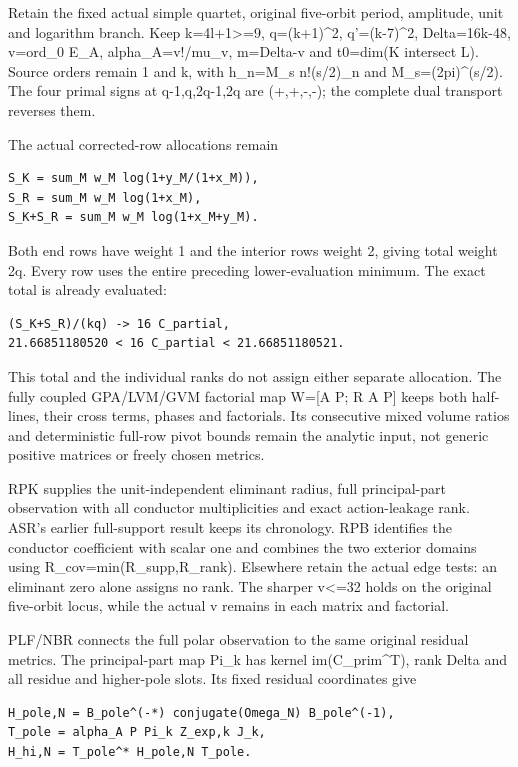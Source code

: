 \documentclass[
]{article}
\begin{document}
Retain the fixed actual simple quartet, original five-orbit period,
amplitude, unit and logarithm branch. Keep k=4l+1\textgreater=9,
q=(k+1)\^{}2, q'=(k-7)\^{}2, Delta=16k-48, v=ord\_0 E\_A,
alpha\_A=v!/mu\_v, m=Delta-v and t0=dim(K intersect L). Source orders
remain 1 and k, with h\_n=M\_s n!(s/2)\_n and M\_s=(2pi)\^{}(s/2). The
four primal signs at q-1,q,2q-1,2q are (+,+,-,-); the complete dual
transport reverses them.

The actual corrected-row allocations remain

\begin{verbatim}
S_K = sum_M w_M log(1+y_M/(1+x_M)),
S_R = sum_M w_M log(1+x_M),
S_K+S_R = sum_M w_M log(1+x_M+y_M).
\end{verbatim}

Both end rows have weight 1 and the interior rows weight 2, giving total
weight 2q. Every row uses the entire preceding lower-evaluation minimum.
The exact total is already evaluated:

\begin{verbatim}
(S_K+S_R)/(kq) -> 16 C_partial,
21.66851180520 < 16 C_partial < 21.66851180521.
\end{verbatim}

This total and the individual ranks do not assign either separate
allocation. The fully coupled GPA/LVM/GVM factorial map W={[}A P; R A
P{]} keeps both half-lines, their cross terms, phases and factorials.
Its consecutive mixed volume ratios and deterministic full-row pivot
bounds remain the analytic input, not generic positive matrices or
freely chosen metrics.

RPK supplies the unit-independent eliminant radius, full principal-part
observation with all conductor multiplicities and exact action-leakage
rank. ASR's earlier full-support result keeps its chronology. RPB
identifies the conductor coefficient with scalar one and combines the
two exterior domains using R\_cov=min(R\_supp,R\_rank). Elsewhere retain
the actual edge tests: an eliminant zero alone assigns no rank. The
sharper v\textless=32 holds on the original five-orbit locus, while the
actual v remains in each matrix and factorial.

PLF/NBR connects the full polar observation to the same original
residual metrics. The principal-part map Pi\_k has kernel
im(C\_prim\^{}T), rank Delta and all residue and higher-pole slots. Its
fixed residual coordinates give

\begin{verbatim}
H_pole,N = B_pole^(-*) conjugate(Omega_N) B_pole^(-1),
T_pole = alpha_A P Pi_k Z_exp,k J_k,
H_hi,N = T_pole^* H_pole,N T_pole.
\end{verbatim}
\end{document}
